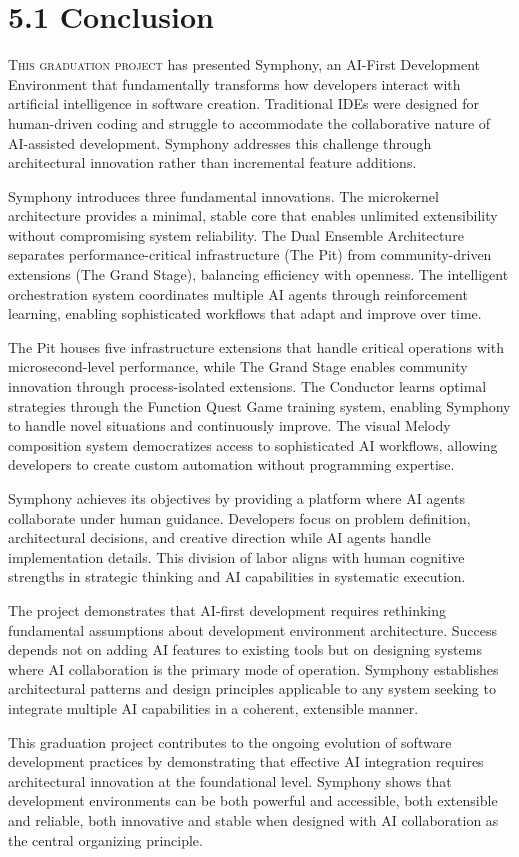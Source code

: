 
\section{5.1 Conclusion}
\label{sec:conclusion}
\setcounter{subsection}{0}

\lettrine{T}{his graduation project} has presented Symphony, an AI-First Development Environment that fundamentally transforms how developers interact with artificial intelligence in software creation. Traditional IDEs were designed for human-driven coding and struggle to accommodate the collaborative nature of AI-assisted development. Symphony addresses this challenge through architectural innovation rather than incremental feature additions.

Symphony introduces three fundamental innovations. The microkernel architecture provides a minimal, stable core that enables unlimited extensibility without compromising system reliability. The Dual Ensemble Architecture separates performance-critical infrastructure (The Pit) from community-driven extensions (The Grand Stage), balancing efficiency with openness. The intelligent orchestration system coordinates multiple AI agents through reinforcement learning, enabling sophisticated workflows that adapt and improve over time.

The Pit houses five infrastructure extensions that handle critical operations with microsecond-level performance, while The Grand Stage enables community innovation through process-isolated extensions. The Conductor learns optimal strategies through the Function Quest Game training system, enabling Symphony to handle novel situations and continuously improve. The visual Melody composition system democratizes access to sophisticated AI workflows, allowing developers to create custom automation without programming expertise.

Symphony achieves its objectives by providing a platform where AI agents collaborate under human guidance. Developers focus on problem definition, architectural decisions, and creative direction while AI agents handle implementation details. This division of labor aligns with human cognitive strengths in strategic thinking and AI capabilities in systematic execution.

The project demonstrates that AI-first development requires rethinking fundamental assumptions about development environment architecture. Success depends not on adding AI features to existing tools but on designing systems where AI collaboration is the primary mode of operation. Symphony establishes architectural patterns and design principles applicable to any system seeking to integrate multiple AI capabilities in a coherent, extensible manner.

This graduation project contributes to the ongoing evolution of software development practices by demonstrating that effective AI integration requires architectural innovation at the foundational level. Symphony shows that development environments can be both powerful and accessible, both extensible and reliable, both innovative and stable when designed with AI collaboration as the central organizing principle.

